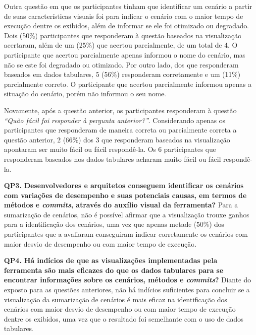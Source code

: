 Outra questão em que os participantes tinham que identificar um cenário a partir de suas características visuais foi para indicar o cenário com o maior tempo de execução dentre os exibidos, além de informar se ele foi otimizado ou degradado. Dois (50\%) participantes que responderam à questão baseados na visualização acertaram, além de um (25\%) que acertou parcialmente, de um total de 4. O participante que acertou parcialmente apenas informou o nome do cenário, mas não se este foi degradado ou otimizado. Por outro lado, dos que responderam baseados em dados tabulares, 5 (56\%) responderam corretamente e um (11\%) parcialmente correto. O participante que acertou parcialmente informou apenas a situação do cenário, porém não informou o seu nome.

Novamente, após a questão anterior, os participantes responderam à questão \textit{``Quão fácil foi responder à pergunta anterior?''}. Considerando apenas os participantes que responderam de maneira correta ou parcialmente correta a questão anterior, 2 (66\%) dos 3 que responderam baseados na visualização apontaram ser muito fácil ou fácil respondê-la. Os 6 participantes que responderam baseados nos dados tabulares acharam muito fácil ou fácil respondê-la.

\begin{framed}
\noindent \textbf{QP3. Desenvolvedores e arquitetos conseguem identificar os cenários com variações de desempenho e suas potenciais causas, em termos de métodos e \textit{commits}, através do auxílio visual da ferramenta?} Para a sumarização de cenários, não é possível afirmar que a visualização trouxe ganhos para a identificação dos cenários, uma vez que apenas metade (50\%) dos participantes que a avaliaram conseguiram indicar corretamente os cenários com maior desvio de desempenho ou com maior tempo de execução.
\end{framed}

\begin{framed}
\noindent \textbf{QP4. Há indícios de que as visualizações implementadas pela ferramenta são mais eficazes do que os dados tabulares para se encontrar informações sobre os cenários, métodos e \textit{commits}?} Diante do exposto para as questões anteriores, não há indícios suficientes para concluir se a visualização da sumarização de cenários é mais eficaz na identificação dos cenários com maior desvio de desempenho ou com maior tempo de execução dentre os exibidos, uma vez que o resultado foi semelhante com o uso de dados tabulares.
\end{framed}

